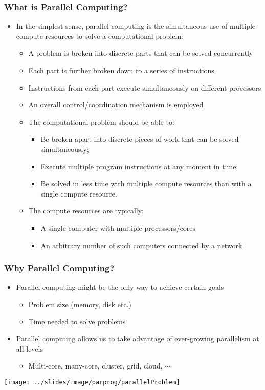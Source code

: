 \documentclass[10pt,t]{beamer}
\begin{document}
\begin{frame}
  \frametitle{What is Parallel Computing?}
  \begin{itemize}
  \item In the simplest sense, parallel computing is the simultaneous use of multiple compute resources to solve a computational problem:
    \begin{itemize}
    \item A problem is broken into discrete parts that can be solved concurrently
    \item Each part is further broken down to a series of instructions
    \item Instructions from each part execute simultaneously on different processors
    \item An overall control/coordination mechanism is employed
    \item The computational problem should be able to:
      \begin{itemize}
      \item Be broken apart into discrete pieces of work that can be solved simultaneously;
      \item Execute multiple program instructions at any moment in time;
      \item Be solved in less time with multiple compute resources than with a single compute resource.
      \end{itemize}
    \item The compute resources are typically:
      \begin{itemize}
      \item A single computer with multiple processors/cores
      \item An arbitrary number of such computers connected by a network
      \end{itemize}
    \end{itemize}
  \end{itemize}
\end{frame}

\begin{frame}
  \frametitle{Why Parallel Computing?}
  \begin{itemize}
  \item Parallel computing might be the only way to achieve certain goals
    \begin{itemize}
    \item Problem size (memory, disk etc.)
    \item Time needed to solve problems
    \end{itemize}
  \item Parallel computing allows us to take advantage of ever-growing parallelism at all levels
    \begin{itemize}
    \item  Multi-core, many-core, cluster, grid, cloud, $\cdots$
    \end{itemize}
  \end{itemize}
  \begin{center}
    \texttt{[image: ../slides/image/parprog/parallelProblem]}
  \end{center}
\end{frame}
\end{document}

